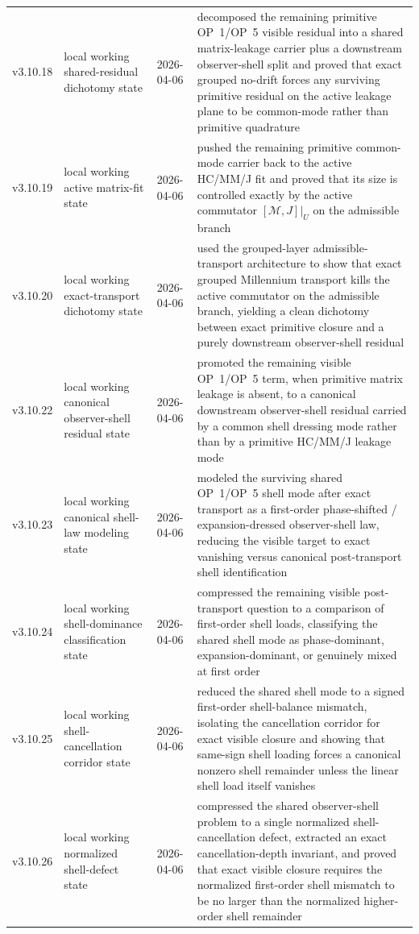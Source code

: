 {\begin{longtable}{|p{}|p{}|p{}|p{}|}
  v3.10.18 & local working shared-residual dichotomy state & 2026-04-06 & decomposed the remaining primitive OP~1/OP~5 visible residual into a shared matrix-leakage carrier plus a downstream observer-shell split and proved that exact grouped no-drift forces any surviving primitive residual on the active leakage plane to be common-mode rather than primitive quadrature \\
  v3.10.19 & local working active matrix-fit state & 2026-04-06 & pushed the remaining primitive common-mode carrier back to the active HC/MM/J fit and proved that its size is controlled exactly by the active commutator $[\mathcal M,J]|_{U}$ on the admissible branch \\
  v3.10.20 & local working exact-transport dichotomy state & 2026-04-06 & used the grouped-layer admissible-transport architecture to show that exact grouped Millennium transport kills the active commutator on the admissible branch, yielding a clean dichotomy between exact primitive closure and a purely downstream observer-shell residual \\
  v3.10.22 & local working canonical observer-shell residual state & 2026-04-06 & promoted the remaining visible OP~1/OP~5 term, when primitive matrix leakage is absent, to a canonical downstream observer-shell residual carried by a common shell dressing mode rather than by a primitive HC/MM/J leakage mode \\
  v3.10.23 & local working canonical shell-law modeling state & 2026-04-06 & modeled the surviving shared OP~1/OP~5 shell mode after exact transport as a first-order phase-shifted / expansion-dressed observer-shell law, reducing the visible target to exact vanishing versus canonical post-transport shell identification \\
  v3.10.24 & local working shell-dominance classification state & 2026-04-06 & compressed the remaining visible post-transport question to a comparison of first-order shell loads, classifying the shared shell mode as phase-dominant, expansion-dominant, or genuinely mixed at first order \\
  v3.10.25 & local working shell-cancellation corridor state & 2026-04-06 & reduced the shared shell mode to a signed first-order shell-balance mismatch, isolating the cancellation corridor for exact visible closure and showing that same-sign shell loading forces a canonical nonzero shell remainder unless the linear shell load itself vanishes \\
  v3.10.26 & local working normalized shell-defect state & 2026-04-06 & compressed the shared observer-shell problem to a single normalized shell-cancellation defect, extracted an exact cancellation-depth invariant, and proved that exact visible closure requires the normalized first-order shell mismatch to be no larger than the normalized higher-order shell remainder \\

\end{longtable}}
